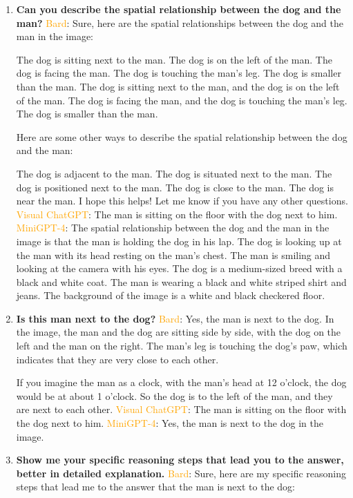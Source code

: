     \begin{enumerate}
        \item \textbf{Can you describe the spatial relationship between the dog and the man?}
        \subitem \textcolor{orange}{Bard}: 
        Sure, here are the spatial relationships between the dog and the man in the image:
        
        The dog is sitting next to the man.
        The dog is on the left of the man.
        The dog is facing the man.
        The dog is touching the man's leg.
        The dog is smaller than the man.
        The dog is sitting next to the man, and the dog is on the left of the man. The dog is facing the man, and the dog is touching the man's leg. The dog is smaller than the man.
        
        Here are some other ways to describe the spatial relationship between the dog and the man:
        
        The dog is adjacent to the man.
        The dog is situated next to the man.
        The dog is positioned next to the man.
        The dog is close to the man.
        The dog is near the man.
        I hope this helps! Let me know if you have any other questions.
        \subitem \textcolor{orange}{Visual ChatGPT}: The man is sitting on the floor with the dog next to him.
        \subitem \textcolor{orange}{MiniGPT-4}: The spatial relationship between the dog and the man in the image is that the man is holding the dog in his lap. The dog is looking up at the man with its head resting on the man’s chest. The man is smiling and looking at the camera with his eyes. The dog is a medium-sized breed with a black and white coat. The man is wearing a black and white striped shirt and jeans. The background of the image is a white and black checkered floor.
        \item \textbf{Is this man next to the dog?}
        \subitem \textcolor{orange}{Bard}: Yes, the man is next to the dog. In the image, the man and the dog are sitting side by side, with the dog on the left and the man on the right. The man's leg is touching the dog's paw, which indicates that they are very close to each other.

        If you imagine the man as a clock, with the man's head at 12 o'clock, the dog would be at about 1 o'clock. So the dog is to the left of the man, and they are next to each other.
        \subitem \textcolor{orange}{Visual ChatGPT}: The man is sitting on the floor with the dog next to him.
        \subitem \textcolor{orange}{MiniGPT-4}: Yes, the man is next to the dog in the image.
        \item \textbf{Show me your specific reasoning steps that lead you to the answer, better in detailed explanation.}
        \subitem \textcolor{orange}{Bard}: 
        Sure, here are my specific reasoning steps that lead me to the answer that the man is next to the dog:
        

\end{enumerate}
